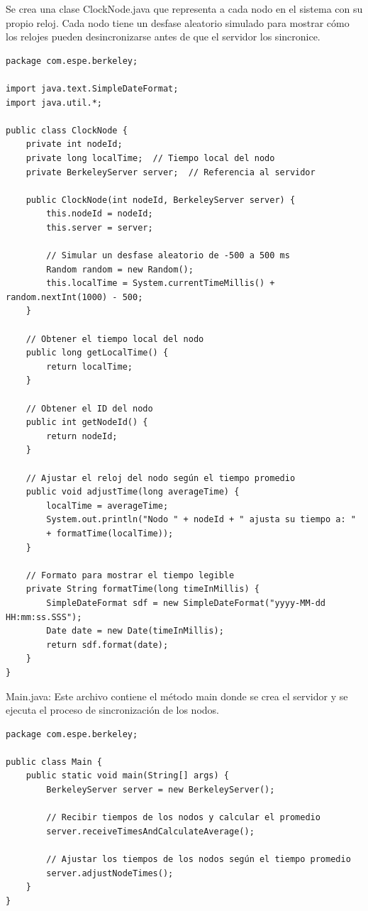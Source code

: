 \documentclass[a4paper,12pt]{report}
\begin{document}
Se crea una clase ClockNode.java que representa a cada nodo en el sistema con su propio reloj. Cada nodo tiene un desfase aleatorio simulado para mostrar cómo los relojes pueden desincronizarse antes de que el servidor los sincronice.
\begin{verbatim}
package com.espe.berkeley;

import java.text.SimpleDateFormat;
import java.util.*;

public class ClockNode {
    private int nodeId;
    private long localTime;  // Tiempo local del nodo
    private BerkeleyServer server;  // Referencia al servidor

    public ClockNode(int nodeId, BerkeleyServer server) {
        this.nodeId = nodeId;
        this.server = server;

        // Simular un desfase aleatorio de -500 a 500 ms
        Random random = new Random();
        this.localTime = System.currentTimeMillis() + random.nextInt(1000) - 500;
    }

    // Obtener el tiempo local del nodo
    public long getLocalTime() {
        return localTime;
    }

    // Obtener el ID del nodo
    public int getNodeId() {
        return nodeId;
    }

    // Ajustar el reloj del nodo según el tiempo promedio
    public void adjustTime(long averageTime) {
        localTime = averageTime;
        System.out.println("Nodo " + nodeId + " ajusta su tiempo a: " 
        + formatTime(localTime));
    }

    // Formato para mostrar el tiempo legible
    private String formatTime(long timeInMillis) {
        SimpleDateFormat sdf = new SimpleDateFormat("yyyy-MM-dd HH:mm:ss.SSS");
        Date date = new Date(timeInMillis);
        return sdf.format(date);
    }
}
\end{verbatim}
Main.java: Este archivo contiene el método main donde se crea el servidor y se ejecuta el proceso de sincronización de los nodos.
\begin{verbatim}
package com.espe.berkeley;

public class Main {
    public static void main(String[] args) {
        BerkeleyServer server = new BerkeleyServer();

        // Recibir tiempos de los nodos y calcular el promedio
        server.receiveTimesAndCalculateAverage();

        // Ajustar los tiempos de los nodos según el tiempo promedio
        server.adjustNodeTimes();
    }
}
\end{verbatim}
\end{document}
